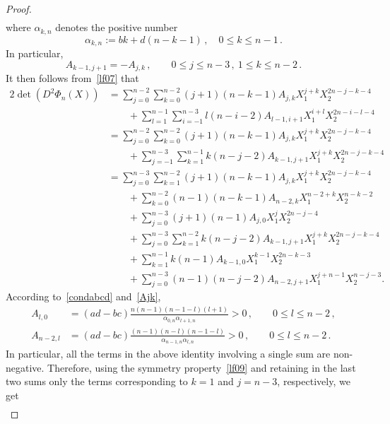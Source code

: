 \documentclass[AHL,Unicode,longabstracts,published]{cedram}
\begin{document}
\begin{proof}
\begin{multline}
\end{multline}
where $\alpha_{k,n}$ denotes the positive number
\begin{equation*}
\alpha_{k,n}:=bk+d(n-k-1)\,,\quad 0\leq k\leq n-1\,.
\end{equation*}
In particular,
\begin{equation}\label{lf09}
A_{k-1,j+1} = - A_{j,k}\,, \qquad 0\le j\le n-3\,, \ 1\le k\le n-2\,. 
\end{equation}
It then follows from~\eqref{lf07} that
\begingroup
\allowdisplaybreaks
\begin{align*}
2 \det(D^2\Phi_n(X))& = \sum_{j=0}^{n-2} \sum_{k=0}^{n-2} (j+1)(n-k-1) A_{j,k} X_1^{j+k} X_2^{2n-j-k-4} \\
& \qquad + \sum_{l=1}^{n-1} \sum_{i=-1}^{n-3} l(n-i-2) A_{l-1,i+1} X_1^{i+l} X_2^{2n-i-l-4} \\
& = \sum_{j=0}^{n-2} \sum_{k=0}^{n-2} (j+1)(n-k-1) A_{j,k} X_1^{j+k} X_2^{2n-j-k-4} \\
& \qquad + \sum_{j=-1}^{n-3} \sum_{k=1}^{n-1} k(n-j-2) A_{k-1,j+1} X_1^{j+k} X_2^{2n-j-k-4}\\
& = \sum_{j=0}^{n-3} \sum_{k=1}^{n-2} (j+1)(n-k-1) A_{j,k} X_1^{j+k} X_2^{2n-j-k-4} \\
& \qquad + \sum_{k=0}^{n-2} (n-1)(n-k-1) A_{n-2,k} X_1^{n-2+k} X_2^{n-k-2} \\
& \qquad + \sum_{j=0}^{n-3} (j+1)(n-1) A_{j,0} X_1^{j} X_2^{2n-j-4} \\
& \qquad + \sum_{j=0}^{n-3} \sum_{k=1}^{n-2} k(n-j-2) A_{k-1,j+1} X_1^{j+k} X_2^{2n-j-k-4} \\
& \qquad + \sum_{k=1}^{n-1} k(n-1) A_{k-1,0} X_1^{k-1} X_2^{2n-k-3} \\
& \qquad + \sum_{j=0}^{n-3} (n-1)(n-j-2) A_{n-2,j+1} X_1^{j+n-1} X_2^{n-j-3}.
\end{align*}
\endgroup
According to~\eqref{condabcd} and~\eqref{Ajk},
\begin{align*}
A_{l,0} & = (ad-bc) \frac{n(n-1)(n-1-l)(l+1)}{\alpha_{0,n}\alpha_{l+1,n}}>0\,, \qquad 0\le l\le n-2\,,\\
A_{n-2,l} & = (ad-bc) \frac{(n-1)(n-l)(n-1-l)}{\alpha_{n-1,n}\alpha_{l,n}}>0\,, \qquad 0\le l\le n-2\,.
\end{align*}
In particular, all the terms in the above identity involving a single sum are non-negative. Therefore, using the symmetry property~\eqref{lf09} and retaining in the last two sums only the terms corresponding to $k=1$ and $j=n-3$, respectively, we get
\begin{align*}

\end{align*}
\end{proof}
\end{document}

